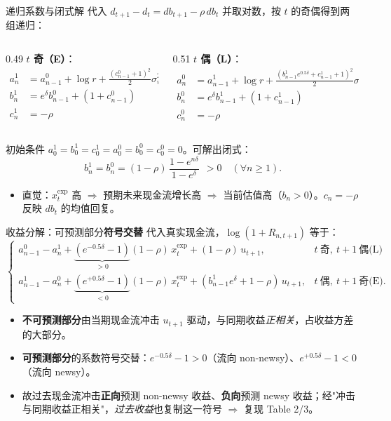 \documentclass[aspectratio=169,10pt]{beamer}
\newcommand{\xexp}{x^{\mathrm{exp}}}
\begin{document}
\begin{frame}{递归系数与闭式解}
	代入 $d_{t+1}-d_t=db_{t+1}-\rho\,db_t$ 并取对数，按 $t$ 的奇偶得到两组递归：
	\begin{columns}[t]
		\begin{column}{0.49\textwidth}
			\textbf{$t$ 奇（E）}：
			\begin{align*}
				a^1_n&=a^0_{n-1}+\log r+\tfrac{(c^0_{n-1}+1)^2}{2}\sigma_u^2\\
				b^1_n&=e^{\delta}b^0_{n-1}+(1+c^0_{n-1})\\
				c^1_n&=-\rho
			\end{align*}
		\end{column}
		\begin{column}{0.51\textwidth}
			\textbf{$t$ 偶（L）}：
			\begin{align*}
				a^0_n&=a^1_{n-1}+\log r+\tfrac{(b^1_{n-1}e^{0.5\delta}+c^1_{n-1}+1)^2}{2}\sigma_u^2\\
				b^0_n&=e^{\delta}b^1_{n-1}+(1+c^1_{n-1})\\
				c^0_n&=-\rho
			\end{align*}
		\end{column}
	\end{columns}
	\vspace{4pt}
	初始条件 $a^1_0=b^1_0=c^1_0=a^0_0=b^0_0=c^0_0=0$。可解出闭式：
	\[
	\boxed{\,b^1_n=b^0_n=(1-\rho)\,\frac{1-e^{n\delta}}{1-e^{\delta}}\, }\;>0\quad(\forall n\ge 1).
	\]
	\begin{itemize}
		\item 直觉：$\xexp_t$ 高 $\Rightarrow$ 预期未来现金流增长高 $\Rightarrow$ 当前估值高（$b_n>0$）。$c_n=-\rho$ 反映 $db_t$ 的均值回复。
	\end{itemize}
\end{frame}

\begin{frame}{收益分解：可预测部分\textbf{符号交替}}
	代入真实现金流，$\log(1+R_{n,t+1})$ 等于：
	\[
	\begin{cases}
		a^0_{n-1}-a^1_n+\underbrace{(e^{-0.5\delta}-1)}_{>0}(1-\rho)\,\xexp_t+(1-\rho)\,u_{t+1}, & t\ \text{奇},\ t{+}1\ \text{偶(L)}\\[1.4ex]
		a^1_{n-1}-a^0_n+\underbrace{(e^{+0.5\delta}-1)}_{<0}(1-\rho)\,\xexp_t+(b^1_{n-1}e^{\delta}+1-\rho)\,u_{t+1}, & t\ \text{偶},\ t{+}1\ \text{奇(E)}.
	\end{cases}
	\]
	\begin{itemize}
		\item \textbf{不可预测部分}由当期现金流冲击 $u_{t+1}$ 驱动，与同期收益\emph{正相关}，占收益方差的大部分。
		\item \textbf{可预测部分}的系数符号交替：$e^{-0.5\delta}-1>0$（流向 non-newsy）、$e^{+0.5\delta}-1<0$（流向 newsy）。
		\item 故过去现金流冲击\textbf{正向}预测 non-newsy 收益、\textbf{负向}预测 newsy 收益；经"冲击与同期收益正相关"，\emph{过去收益}也复制这一符号 $\Rightarrow$ 复现 Table 2/3。
	\end{itemize}
\end{frame}
\end{document}
